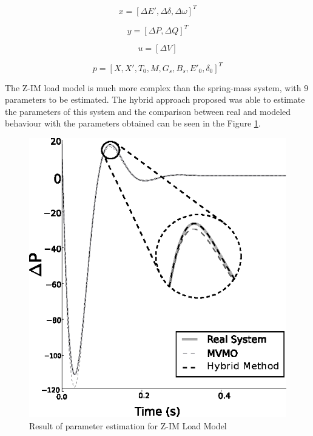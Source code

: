 \begin{equation}
	x = [\Delta E', \Delta \delta, \Delta \omega]^{T}
	\label{eq: ZIMstate}
\end{equation}

\begin{equation}
	y = [\Delta P, \Delta Q]^{T}
	\label{eq: ZIMoutput}
\end{equation}

\begin{equation}
	u = [\Delta V]
	\label{eq: ZIMinput}
\end{equation}

\begin{equation}
	p = [X, X', T_{0}, M, G_{s}, B_{s}, E'_{0}, \delta_{0}]^{T}
	\label{eq: ZIMparam}
\end{equation}

The Z-IM load model is much more complex than the spring-mass system, with 9 parameters to be estimated. The hybrid approach proposed was able to estimate the parameters of this system and the comparison between real and modeled behaviour with the parameters obtained can be seen in the Figure \ref{fig: ZIM}.

\begin{figure}[h]
	\caption{Result of parameter estimation for Z-IM Load Model}
	\begin{center}
		\includegraphics[scale=1]{Images/ZIM.eps}
	\end{center}
	\label{fig: ZIM}
\end{figure}

